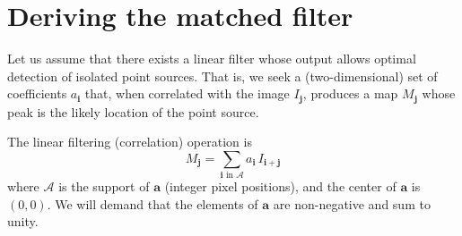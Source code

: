 \documentclass[11pt,letterpaper,linenumbers]{aastex63}
\renewcommand{\vec}[1]{\boldsymbol{#1}}
\newcommand{\avec}{\vec{a}}
\newcommand{\ivec}{\vec{i}}
\newcommand{\jvec}{\vec{j}}
\newcommand{\coord}[2]{(#1, #2)}
\newcommand{\iina}{\ivec \,\, \mathrm{in} \,\, \mathcal{A}}
\begin{document}
% 
% 
% 
% 
% 
% 
% 
% 
% 

\appendix

\section{Deriving the matched filter}
\label{app:lindet}

Let us assume that there exists a linear filter whose output allows
optimal detection of isolated point sources.  That is, we seek a
(two-dimensional) set of coefficients $a_{\ivec}$ that, when
correlated with the image $I_{\jvec}$, produces a map $M_{\jvec}$
whose peak is the likely location of the point source.


The linear filtering (correlation) operation is
\begin{equation}
M_{\jvec} = \sum_{\iina} a_{\ivec} \, I_{\ivec + \jvec}
\label{eq:detmap1}
\end{equation}
where $\mathcal{A}$ is the support of $\avec$ (integer pixel
positions), and the center of $\avec$ is $\coord{0}{0}$.  We will
demand that the elements of $\avec$ are non-negative and sum to unity.
\end{document}
